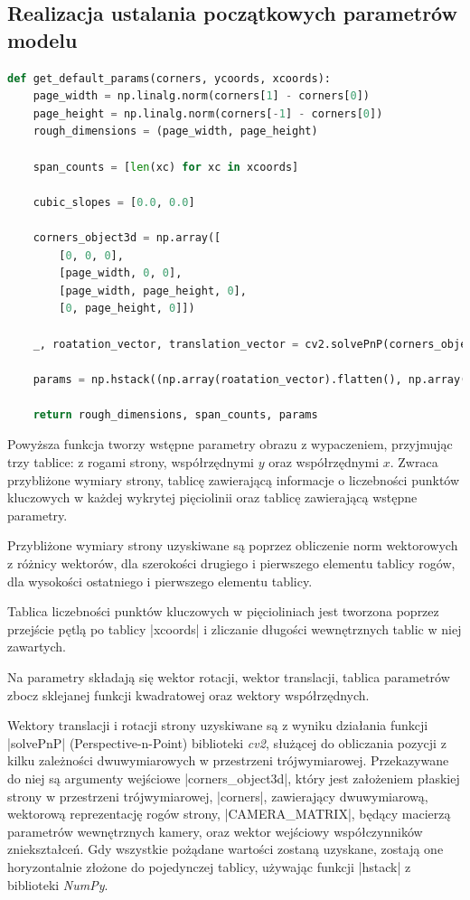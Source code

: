 \subsection{Realizacja ustalania początkowych parametrów modelu}
\begin{lstlisting}[caption={\pyth| get_default_params()| - funkcja tworząca początkowe parametry obrazu}, label={get-default-params}, language=Python]
def get_default_params(corners, ycoords, xcoords):
	page_width = np.linalg.norm(corners[1] - corners[0])
	page_height = np.linalg.norm(corners[-1] - corners[0])
	rough_dimensions = (page_width, page_height)
	
	span_counts = [len(xc) for xc in xcoords]
	
	cubic_slopes = [0.0, 0.0]
	
	corners_object3d = np.array([
		[0, 0, 0],
		[page_width, 0, 0],
		[page_width, page_height, 0],
		[0, page_height, 0]])
	
	_, roatation_vector, translation_vector = cv2.solvePnP(corners_object3d, corners, CAMERA_MATRIX, np.zeros(5))
	
	params = np.hstack((np.array(roatation_vector).flatten(), np.array(translation_vector).flatten(), np.array(cubic_slopes).flatten(), ycoords.flatten()) + tuple(xcoords))
	
	return rough_dimensions, span_counts, params
\end{lstlisting}

Powyższa funkcja tworzy wstępne parametry obrazu z wypaczeniem, przyjmując trzy tablice: z rogami strony, współrzędnymi $y$ oraz współrzędnymi $x$. Zwraca przybliżone wymiary strony, tablicę zawierającą informacje o liczebności punktów kluczowych w każdej wykrytej pięciolinii oraz tablicę zawierającą wstępne parametry.

Przybliżone wymiary strony uzyskiwane są poprzez obliczenie norm wektorowych z różnicy wektorów, dla szerokości drugiego i pierwszego elementu tablicy rogów, dla wysokości ostatniego i pierwszego elementu tablicy. 

Tablica liczebności punktów kluczowych w pięcioliniach jest tworzona poprzez przejście pętlą po tablicy \pyth|xcoords| i zliczanie długości wewnętrznych tablic w niej zawartych.

Na parametry składają się wektor rotacji, wektor translacji, tablica parametrów zbocz sklejanej funkcji kwadratowej oraz wektory współrzędnych. 

Wektory translacji i rotacji strony uzyskiwane są z wyniku działania funkcji \pyth|solvePnP| (Perspective-n-Point) biblioteki \textit{cv2}, służącej do obliczania pozycji z kilku zależności dwuwymiarowych w przestrzeni trójwymiarowej. Przekazywane do niej są argumenty wejściowe \pyth|corners_object3d|, który jest założeniem płaskiej strony w przestrzeni trójwymiarowej, \pyth|corners|, zawierający dwuwymiarową, wektorową reprezentację rogów strony, \pyth|CAMERA_MATRIX|, będący macierzą parametrów wewnętrznych kamery, oraz wektor wejściowy współczynników zniekształceń. Gdy wszystkie pożądane wartości zostaną uzyskane, zostają one horyzontalnie złożone do pojedynczej tablicy, używając funkcji \pyth|hstack| z biblioteki \textit{NumPy}.



